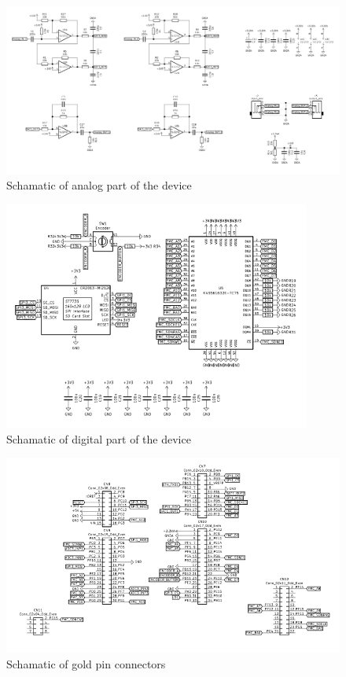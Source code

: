 \documentclass[a4paper,twoside,12pt]{book}
\begin{document}
\begin{figure}[H]
    \centering
    \includegraphics[width=\textwidth]{images/Schematic_analog}
    \caption{Schamatic of analog part of the device}
    \label{fig:Schematic1}
\end{figure}

\begin{figure}[H]
    \centering
    \includegraphics[width=0.9\textwidth]{images/Schematic_digital}
    \caption{Schamatic of digital part of the device}
    \label{fig:Schematic2}
\end{figure}

\begin{figure}[H]
    \centering
    \includegraphics[width=\textwidth]{images/Schematic_connectors}
    \caption{Schamatic of gold pin connectors}
    \label{fig:Schematic3}
\end{figure}
\end{document}

